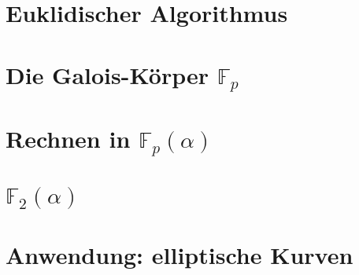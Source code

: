 %
%
%
\section{Euklidischer Algorithmus}

\section{Die Galois-Körper $\mathbb{F}_p$}

\section{Rechnen in $\mathbb{F}_p(\alpha)$}

\section{$\mathbb{F}_2(\alpha)$}

\section{Anwendung: elliptische Kurven}
